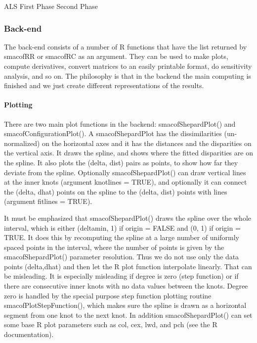 \documentclass[
  12pt,
]{article}
\begin{document}
ALS First Phase Second Phase

\subsubsection{Back-end}\label{back-end}

The back-end consists of a number of R functions that have the list
returned by smacofRR or smacofRC as an argument. They can be used to
make plots, compute derivatives, convert matrices to an easily
printable format, do sensitivity analysis, and so on. The philosophy
is that in the backend the main computing is finished and we
just create different representations of the results.

\paragraph{Plotting}\label{plotting}

There are two main plot functions in the backend: smacofShepardPlot()
and smacofConfigurationPlot(). A smacofShepardPlot has the
dissimilarities (un-normalized) on the horizontal axes and
it has the distances and the disparities on the vertical axis.
It draws the spline, and shows where the fitted disparities are
on the spline. It also plots the (delta, dist) pairs as points,
to show how far they deviate from the spline. Optionally
smacofShepardPlot() can draw vertical lines at the inner knots
(argument knotlines = TRUE), and optionally it can connect
the (delta, dhat) points on the spline to the (delta, dist)
points with lines (argument fitlines = TRUE).

It must be emphasized that smacofShepardPlot() draws the spline
over the whole interval, which is either (deltamin, 1)
if origin = FALSE and (0, 1) if origin = TRUE. It does
this by recomputing the spline at a large number of
uniformly spaced points in the interval, where the
number of points is given by the smacofShepardPlot()
parameter resolution. Thus we do not use only the
data points (delta,dhat) and then let the R plot function
interpolate linearly. That can be misleading. It is
especially misleading if degree is zero (step function)
or if there are consecutive inner knots with no data values
between the knots. Degree zero is handled by the special
purpose step function plotting routine smacofPlotStepFunction(),
which makes sure the spline is drawn as a horizontal segment
from one knot to the next knot. In addition smacofShepardPlot()
can set some base R plot parameters such as col, cex, lwd, and pch
(see the R documentation).
\end{document}

